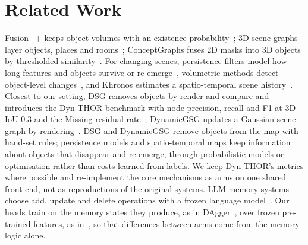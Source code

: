 \section{Related Work}
\label{sec:related}

Fusion++ keeps object volumes with an existence probability~\cite{fusionpp2018}; 3D scene graphs layer objects, places and rooms~\cite{dsg3d2020,hydra2022}; ConceptGraphs fuses 2D masks into 3D objects by thresholded similarity~\cite{conceptgraphs2024}.
For changing scenes, persistence filters model how long features and objects survive or re-emerge~\cite{rosen2016persistence,perpetua2025}, volumetric methods detect object-level changes~\cite{pocd2022,panopticmultitsdf2022}, and Khronos estimates a spatio-temporal scene history~\cite{khronos2024}.
Closest to our setting, DSG removes objects by render-and-compare and introduces the Dyn-THOR benchmark with node precision, recall and F1 at 3D IoU 0.3 and the Missing residual rate~\cite{dsg2026}; DynamicGSG updates a Gaussian scene graph by rendering~\cite{dynamicgsg2025}.
DSG and DynamicGSG remove objects from the map with hand-set rules; persistence models and spatio-temporal maps keep information about objects that disappear and re-emerge, through probabilistic models or optimisation rather than costs learned from labels.
We keep Dyn-THOR's metrics where possible and re-implement the core mechanisms as arms on one shared front end, not as reproductions of the original systems.
LLM memory systems choose add, update and delete operations with a frozen language model~\cite{mem0_2025}.
Our heads train on the memory states they produce, as in DAgger~\cite{dagger2011}, over frozen pre-trained features, as in~\cite{dinowm2025}, so that differences between arms come from the memory logic alone.
